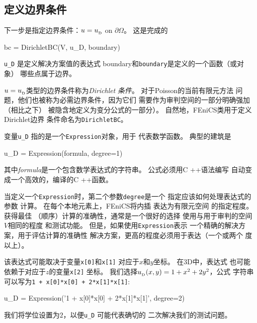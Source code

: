 
\subsection{定义边界条件}
下一步是指定边界条件：$u=\ub$ on
$\partial\Omega$。 这是完成的

\begin{python}
bc = DirichletBC(V, u_D, boundary)
\end{python}

\verb!u_D! 是定义解决方案值的表达式
boundary和\texttt{boundary}是定义的一个函数（或对象）
哪些点属于边界。

$u=\ub$类型的边界条件称为\emph{Dirichlet
条件}。 对于Poisson的当前有限元方法
问题，他们也被称为必需边界条件，因为它们
需要作为审判空间的一部分明确强加（相比之下）
被隐含地定义为变分公式的一部分）。
自然地，FEniCS类用于定义Dirichlet边界
条件命名为\texttt{DirichletBC}。


变量\verb!u_D! 指的是一个\texttt{Expression}对象，用于
代表数学函数。 典型的建筑是

\begin{python}
u_D = Expression(formula, degree=1)
\end{python}

其中\emph{formula}是一个包含数学表达式的字符串。
公式必须用C ++语法编写
自动变成一个高效的，编译的C ++函数。

\begin{notice}[表达和准确性]
当定义一个\texttt{Expression}时，第二个参数\texttt{degree}是一个
指定应该如何处理表达式的参数
计算。 在每个本地元素上，FEniCS将内插
表达为有限元空间
的指定程度。 获得最佳
（顺序）计算的准确性，通常是一个很好的选择
使用与用于审判的空间$ V $相同的程度
和测试功能。 但是，如果使用\texttt{Expression}表示
一个精确的解决方案，用于评估计算的准确性
解决方案，更高的程度必须用于表达（一个或两个
度以上）。
\end{notice}

该表达式可能取决于变量\texttt{x[0]}和\texttt{x[1]}
对应于$x$和$y$坐标。 在3D中，表达式
也可能依赖于对应于$z$的变量\texttt{x[2]}
坐标。 我们选择$\ub(x,y)=1 + x^2 + 2y^2$，公式
字符串可以写为\texttt{1 + x[0]*x[0] + 2*x[1]*x[1]}:

\begin{python}
u_D = Expression('1 + x[0]*x[0] + 2*x[1]*x[1]', degree=2)
\end{python}

我们将学位设置为$2$，以便\verb!u_D! 可能代表确切的
二次解决我们的测试问题。

